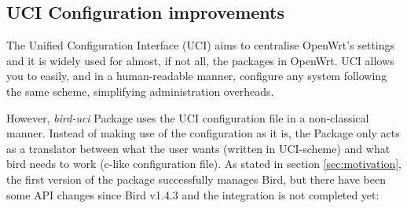 \subsection{UCI Configuration improvements}
\label{sec:uciimp}
The Unified Configuration Interface (UCI) aims to centralise OpenWrt's settings and it is widely used for almost, if not all, the packages in OpenWrt. UCI allows you to easily, and in a human-readable manner, configure any system following the same scheme, simplifying administration overheads.

However, \textit{bird-uci} Package uses the UCI configuration file in a non-classical manner. Instead of making use of the configuration as it is, the Package only acts as a translator between what the user wants (written in UCI-scheme) and what bird needs to work (c-like configuration file). As stated in section \ref{sec:motivation}, the first version of the package successfully manages Bird, but there have been some API changes since Bird v1.4.3 and the integration is not completed yet:

